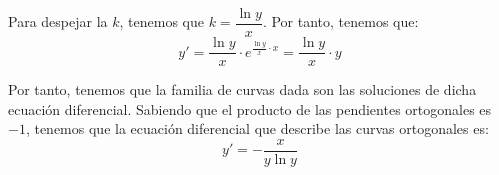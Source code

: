 \begin{ejercicio}
\begin{enumerate}
        Para despejar la $k$, tenemos que $k = \dfrac{\ln y}{x}$. Por tanto, tenemos que:
        \begin{equation*}
            y' = \dfrac{\ln y}{x}\cdot e^{\frac{\ln y}{x}\cdot x} = \dfrac{\ln y}{x}\cdot y
        \end{equation*}

        Por tanto, tenemos que la familia de curvas dada son las soluciones de dicha ecuación diferencial.
        Sabiendo que el producto de las pendientes ortogonales es $-1$, tenemos que la ecuación diferencial que describe las curvas ortogonales es:
        \begin{equation*}
            y' = -\dfrac{x}{y \ln y}
        \end{equation*}
    \end{enumerate}
\end{ejercicio}


